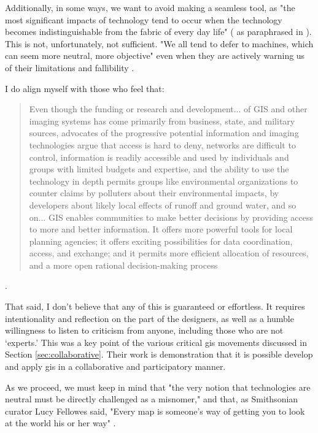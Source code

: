 Additionally, in some ways, we want to avoid making a seamless tool, as "the most significant impacts of technology tend to occur when the technology becomes indistinguishable from the fabric of every day life" (\cite{weinerComputer21stCentury1991} as paraphrased in \cite{vereginComputerInnovationAdoption1994}). This is not, unfortunately, not sufficient. "We all tend to defer to machines, which can seem more neutral, more objective" even when they are actively warning us of their limitations and fallibility \cite{eubanksAutomatingInequalityHow2018}.

I do align myself with those who feel that:

\blockquote{Even though the funding or research and development... of GIS and other imaging systems has come primarily from business, state, and military sources, advocates of the progressive potential information and imaging technologies argue that access is hard to deny, networks are difficult to control, information is readily accessible and used by individuals and groups with limited budgets and expertise, and the ability to use the technology in depth permits groups like environmental organizations to counter claims by polluters about their environmental impacts, by developers about likely local effects of runoff and ground water, and so on... GIS enables communities to make better decisions by providing access to more and better information. It offers more powerful tools for local planning agencies; it offers exciting possibilities for data coordination, access, and exchange; and it permits more efficient allocation of resources, and a more open rational decision-making process} \cite{picklesRepresentationsElectronicAge1994}. 

That said, I don't believe that any of this is guaranteed or effortless. It requires intentionality and reflection on the part of the designers, as well as a humble willingness to listen to criticism from anyone, including those who are not `experts.' This was a key point of the various critical \ac{gis} movements discussed in Section \ref{sec:collaborative}. Their work is demonstration that it is possible develop and apply \ac{gis} in a collaborative and participatory manner.

As we proceed, we must keep in mind that "the very notion that technologies are neutral must be directly challenged as a misnomer," \cite{nobleAlgorithmsOppressionHow2018} and that, as Smithsonian curator Lucy Fellowes said, "Every map is someone's way of getting you to look at the world his or her way" \cite{henriksonPowerPoliticsMaps1994}. 

